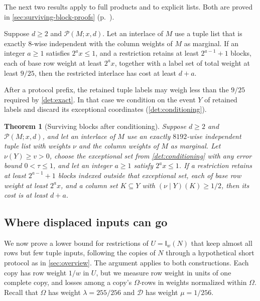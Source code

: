 \documentclass[11pt,letterpaper]{article} \usepackage[utf8]{inputenc}
\theoremstyle{plain} \newtheorem{theorem}{Theorem}[section]
\theoremstyle{definition} \newaliascnt{definition}{theorem}
\newcommand{\Int}[2]{\mathsf{I}_{#1}(#2)}
\newcommand{\RP}[3]{\mathcal{P}(#1;#2,#3)}
\begin{document}
The next two results apply to full products and to explicit lists. Both
are proved in \cref{sec:surviving-block-proofs}
(p.~\pageref{proof:det:exact}).

\begin{lemma}\label{det:exact}
Suppose $d\ge2$ and $\RP{M}{x}{d}$. Let an interlace of $M$ use a tuple list
that is exactly $8$-wise independent with the column weights of $M$ as marginal. If an integer
$a\ge1$ satisfies $2^ax\le1$, and a restriction retains at least
$2^{a-1}+1$ blocks, each of base row weight at least $2^ax$, together with a
label set of total weight at least $9/25$, then the restricted
interlace has cost at least $d+a$.
\end{lemma}

After a protocol prefix, the retained tuple labels may weigh less than the
$9/25$ required by \cref{det:exact}. In that case we condition on the event $Y$
of retained labels and discard its exceptional coordinates (\cref{det:conditioning}).

\begin{theorem}[Surviving blocks after conditioning]\label{det:rareboost}
Suppose $d\ge2$ and $\RP{M}{x}{d}$, and let an interlace of $M$ use an exactly $8192$-wise independent
tuple list with weights $\nu$ and the column weights of $M$ as marginal. Let $\nu(Y)\ge v>0$,
choose the exceptional set from \cref{det:conditioning} with any error bound
$0<\tau\le1$, and let an integer $a\ge1$ satisfy $2^ax\le1$. If a restriction
retains at least $2^{a-1}+1$ blocks indexed outside that exceptional set, each of base row weight at least
$2^ax$, and a column set $K\subseteq Y$ with $(\nu\mid Y)(K)\ge1/2$, then
its cost is at least $d+a$.
\end{theorem}


\subsection{Where displaced inputs can go}\label{sec:internal-interlace}

We now prove a lower bound for restrictions of $U=\Int{w}{N}$ that keep
almost all rows but few tuple inputs, following the
copies of $N$ through a hypothetical short protocol as in \cref{sec:overview}.
The argument applies to both constructions. Each copy has row weight $1/w$
in $U$, but we measure row weight in units of one complete copy, and losses
among a copy's $\Omega$-rows in weights normalized within $\Omega$. Recall that
$\Omega$ has weight $\lambda=255/256$ and $\mathcal D$ has weight $\mu=1/256$.
\end{document}
